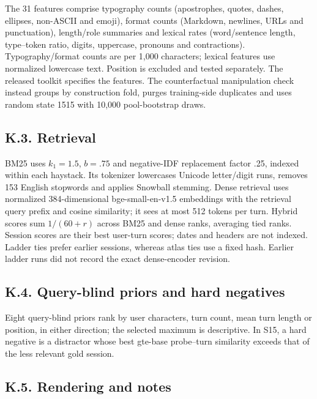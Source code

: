 \documentclass[11pt]{article}
\begin{document}
The 31 features comprise typography counts (apostrophes, quotes, dashes, ellipses, non-ASCII and emoji), format counts (Markdown, newlines, URLs and punctuation), length/\allowbreak{}role summaries and lexical rates (word/\allowbreak{}sentence length, type--token ratio, digits, uppercase, pronouns and contractions). Typography/\allowbreak{}format counts are per 1,000 characters; lexical features use normalized lowercase text. Position is excluded and tested separately. The released toolkit specifies the features. The counterfactual manipulation check instead groups by construction fold, purges training-side duplicates and uses random state 1515 with 10,000 pool-bootstrap draws.

\label{appendix-k3}

\subsection{K.3. Retrieval}\label{k.3.-retrieval}

BM25 uses \(k_1=1.5\), \(b=.75\) and negative-IDF replacement factor .25, indexed within each haystack. Its tokenizer lowercases Unicode letter/\allowbreak{}digit runs, removes 153 English stopwords and applies Snowball stemming. Dense retrieval uses normalized 384-dimensional bge-small-en-v1.5 embeddings with the retrieval query prefix and cosine similarity; it sees at most 512 tokens per turn. Hybrid scores sum \(1/(60+r)\) across BM25 and dense ranks, averaging tied ranks. Session scores are their best user-turn scores; dates and headers are not indexed. Ladder ties prefer earlier sessions, whereas atlas ties use a fixed hash. Earlier ladder runs did not record the exact dense-encoder revision.

\label{appendix-k4}

\subsection{K.4. Query-blind priors and hard negatives}\label{k.4.-query-blind-priors-and-hard-negatives}

Eight query-blind priors rank by user characters, turn count, mean turn length or position, in either direction; the selected maximum is descriptive. In S15, a hard negative is a distractor whose best gte-base probe--turn similarity exceeds that of the less relevant gold session.

\label{appendix-k5}

\subsection{K.5. Rendering and notes}\label{k.5.-rendering-and-notes}
\end{document}
